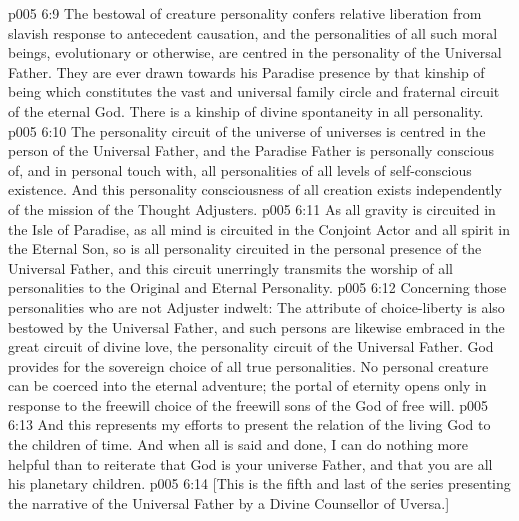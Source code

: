 \vs p005 6:9 \pc The bestowal of creature personality confers relative liberation from slavish response to antecedent causation, and the personalities of all such moral beings, evolutionary or otherwise, are centred in the personality of the Universal Father. They are ever drawn towards his Paradise presence by that kinship of being which constitutes the vast and universal family circle and fraternal circuit of the eternal God. There is a kinship of divine spontaneity in all personality.
\vs p005 6:10 \pc The personality circuit of the universe of universes is centred in the person of the Universal Father, and the Paradise Father is personally conscious of, and in personal touch with, all personalities of all levels of self\hyp{}conscious existence. And this personality consciousness of all creation exists independently of the mission of the Thought Adjusters.
\vs p005 6:11 \pc As all gravity is circuited in the Isle of Paradise, as all mind is circuited in the Conjoint Actor and all spirit in the Eternal Son, so is all personality circuited in the personal presence of the Universal Father, and this circuit unerringly transmits the worship of all personalities to the Original and Eternal Personality.
\vs p005 6:12 \pc Concerning those personalities who are not Adjuster indwelt: The attribute of choice\hyp{}liberty is also bestowed by the Universal Father, and such persons are likewise embraced in the great circuit of divine love, the personality circuit of the Universal Father. God provides for the sovereign choice of all true personalities. No personal creature can be coerced into the eternal adventure; the portal of eternity opens only in response to the freewill choice of the freewill sons of the God of free will.
\vs p005 6:13 \pc And this represents my efforts to present the relation of the living God to the children of time. And when all is said and done, I can do nothing more helpful than to reiterate that God is your universe Father, and that you are all his planetary children.
\vsetoff
\vs p005 6:14 [This is the fifth and last of the series presenting the narrative of the Universal Father by a Divine Counsellor of Uversa.]
\quizlink
{}
